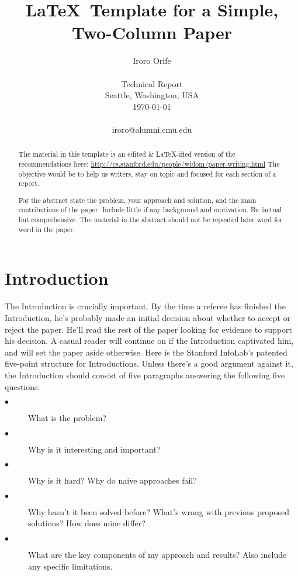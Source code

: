 \documentclass[10pt,twocolumn]{article}
\begin{document}
\title{\LaTeX\ Template for a Simple, Two-Column Paper}

\author{Iroro Orife \\
\\
Technical Report \\
Seattle, Washington, USA \\
\today
\\
\\
iroro@alumni.cmu.edu  \\
}

\maketitle
\thispagestyle{empty}

\begin{abstract}
The material in this template is an edited \& \LaTeX\--ified version of the recommendations here: \url{http://cs.stanford.edu/people/widom/paper-writing.html} The objective would be to help us writers, stay on topic and focused for each section of a report.

For the abstract state the problem, your approach and solution, and the main contributions of the paper. Include little if any background and motivation. Be factual but comprehensive. The material in the abstract should not be repeated later word for word in the paper. 
\end{abstract}


\section{Introduction}
The Introduction is crucially important. By the time a referee has finished the Introduction, he's probably made an initial decision about whether to accept or reject the paper. He'll read the rest of the paper looking for evidence to support his decision. A casual reader will continue on if the Introduction captivated him, and will set the paper aside otherwise. 
Here is the Stanford InfoLab's patented five-point structure for Introductions. Unless there's a good argument against it, the Introduction should consist of five paragraphs answering the following five questions:

\begin{description}
  \item[$\bullet$]  What is the problem?
  \item[$\bullet$]  Why is it interesting and important?
  \item[$\bullet$]  Why is it hard? Why do naive approaches fail?
  \item[$\bullet$]  Why hasn't it been solved before? What's wrong with previous proposed solutions? How does mine differ?
  \item[$\bullet$]  What are the key components of my approach and results? Also include any specific limitations.
\end{description}
  
\end{document}

